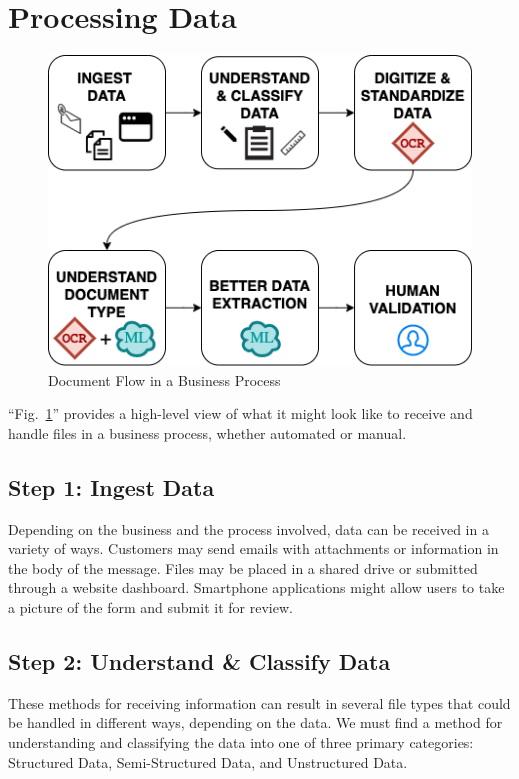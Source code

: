 \documentclass[conference]{IEEEtran}
\begin{document}
\section{Processing Data}

\begin{figure}[ht]
\centerline{\includegraphics[width=\columnwidth]{HighLevelFlow.png}}
\caption{Document Flow in a Business Process}
\label{figHighLevelFlow}
\end{figure}

``Fig.~\ref{figHighLevelFlow}'' provides a high-level view of what it might look like to receive and handle files in a business process, whether automated or manual.

\subsection{Step 1: Ingest Data}
Depending on the business and the process involved, data can be received in a variety of ways. Customers may send emails with attachments or information in the body of the message. Files may be placed in a shared drive or submitted through a website dashboard. Smartphone applications might allow users to take a picture of the form and submit it for review.

\subsection{Step 2: Understand \& Classify Data}
These methods for receiving information can result in several file types that could be handled in different ways, depending on the data. We must find a method for understanding and classifying the data into one of three primary categories: Structured Data, Semi-Structured Data, and Unstructured Data.
\end{document}

